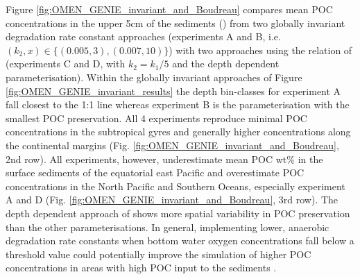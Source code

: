 \documentclass[gmd, manuscript]{copernicus}
\begin{document}
Figure \ref{fig:OMEN_GENIE_invariant_and_Boudreau} compares mean POC concentrations in the upper 5cm of the sediments () from two 
globally invariant degradation rate constant approaches (experiments A and B, i.e. $(k_2, x) \in \{(0.005, 3), (0.007, 10)\}$) 
with two approaches using the relation of \citet{boudreau1997diagenetic} (experiments C and D, with $k_2 = k_1/5$ and the depth dependent parameterisation). 
Within the globally invariant approaches of Figure \ref{fig:OMEN_GENIE_invariant_results} the depth bin-classes for experiment A fall closest to the 
1:1 line whereas experiment B is the parameterisation with the smallest POC preservation. 
All 4 experiments reproduce minimal POC concentrations in the subtropical gyres and generally higher concentrations along the continental margins (Fig. \ref{fig:OMEN_GENIE_invariant_and_Boudreau}, 2nd row). 
All experiments, however, underestimate mean POC wt\% in the surface sediments of the equatorial east Pacific and overestimate POC concentrations 
in the North Pacific and Southern Oceans, especially experiment A and D (Fig. \ref{fig:OMEN_GENIE_invariant_and_Boudreau}, 3rd row). 
The depth dependent approach of \citet{boudreau1997diagenetic} shows more spatial variability in POC preservation than the other parameterisations. 
In general, implementing lower, anaerobic degradation rate constants when bottom water oxygen concentrations fall below a threshold value could potentially improve the simulation of higher POC concentrations in areas with high POC input to the 
sediments \citep{palastanga_long_term_2011}. 
 
\end{document}
